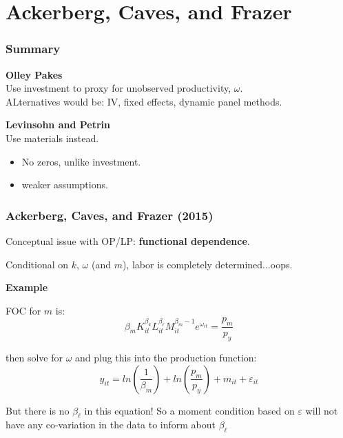 \documentclass[11pt, aspectratio=169]{beamer}
\newcommand{\Skip}{\vspace{1em}}
\newenvironment{wideitemize}{\itemize\addtolength{\itemsep}{10pt}}{\enditemize}
\begin{document}


\section[ACF]{Ackerberg, Caves, and Frazer} %
\label{sec:ackerberg_caves_and_frazer}


\begin{frame}[c]\frametitle{Summary}
    
\textbf{Olley Pakes}\\

Use investment to proxy for unobserved productivity, $\omega$.\\

ALternatives would be: IV, fixed effects, dynamic panel methods.





\Skip
\textbf{Levinsohn and Petrin}\\

Use materials instead. 
\begin{itemize}
	\item No zeros, unlike investment.
	\item weaker assumptions.  
\end{itemize}



\end{frame}


\begin{frame}[c]\frametitle{Ackerberg, Caves, and Frazer (2015)}
    
Conceptual issue with OP/LP: \textbf{functional dependence}.
\begin{wideitemize}
    \item Conditional on $k$, $\omega$ (and $m$), labor is completely determined...oops.
\end{wideitemize}
        
\textbf{Example}        
\begin{wideitemize}
	\item FOC for $m$ is:
	$$\beta_m K_{it}^{\beta_k}L_{it}^{\beta_{\ell}}M_{it}^{\beta_m-1}e^{\omega_{it}} = \frac{p_m}{p_y}$$
	\item then solve for $\omega$ and plug this into the production function:
	$$y_{it} = ln(\frac{1}{\beta_m}) + ln(\frac{p_m}{p_y}) + m_{it} + \varepsilon_{it}$$
	\item But there is no $\beta_{\ell}$ in this equation! So a moment condition based on $\varepsilon$ will not have any co-variation in the data to inform about $\beta_{\ell}$
\end{wideitemize}


\end{frame}
\end{document}
